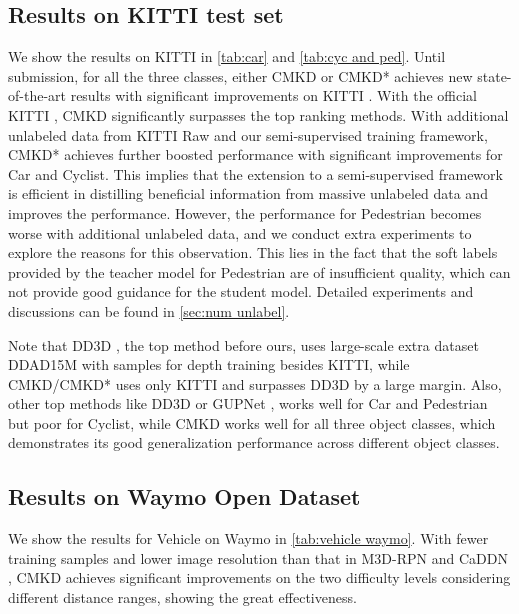 \documentclass[runningheads]{llncs}
\begin{document}
\subsection{Results on KITTI test set}
We show the results on KITTI  in \cref{tab:car} and \cref{tab:cyc and ped}. 
Until submission, for all the three classes, either CMKD or CMKD* achieves new state-of-the-art results with significant improvements on KITTI .
With the official KITTI , CMKD significantly surpasses the top ranking methods. 
With additional unlabeled data from KITTI Raw and our semi-supervised training framework, CMKD* achieves further boosted performance with significant improvements for Car and Cyclist. This implies that the extension to a semi-supervised framework is efficient in distilling beneficial information from massive unlabeled data and improves the performance.
However, the performance for Pedestrian becomes worse with additional unlabeled data, and we conduct extra experiments to explore the reasons for this observation. 
This lies in the fact that the soft labels provided by the teacher model for Pedestrian are of insufficient quality, which can not provide good guidance for the student model.
Detailed experiments and discussions can be found in \cref{sec:num unlabel}.

Note that DD3D \cite{dd3d}, the top method before ours, uses large-scale extra dataset DDAD15M with  samples for depth training besides KITTI, while CMKD/CMKD* uses only KITTI and surpasses DD3D by a large margin.
Also, other top methods like DD3D \cite{dd3d} or GUPNet \cite{gupnet}, works well for Car and Pedestrian but poor for Cyclist, while CMKD works well for all three object classes, which demonstrates its good generalization performance across different object classes. 


\subsection{Results on Waymo Open Dataset}
We show the results for Vehicle on Waymo  in \cref{tab:vehicle waymo}. 
With fewer training samples and lower image resolution than that in M3D-RPN \cite{m3drpn} and CaDDN \cite{CADDN}, CMKD achieves significant improvements on the two difficulty levels considering different distance ranges, showing the great effectiveness.
\end{document}
